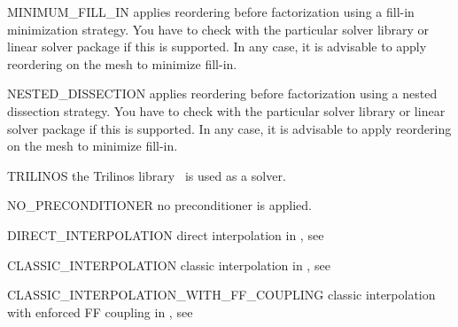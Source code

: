 \begin{memberdesc}[SolverOptions]{MINIMUM_FILL_IN}
applies reordering before factorization using a fill-in minimization strategy.
You have to check with the particular solver library or linear solver package
if this is supported. In any case, it is advisable to apply reordering on the
mesh to minimize fill-in.
\end{memberdesc}

\begin{memberdesc}[SolverOptions]{NESTED_DISSECTION}
applies reordering before factorization using a nested dissection strategy.
You have to check with the particular solver library or linear solver package
if this is supported. In any case, it is advisable to apply reordering on the
mesh to minimize fill-in.
\end{memberdesc}

\begin{memberdesc}[SolverOptions]{TRILINOS}
the Trilinos library~\cite{Trilinos} is used as a solver.
\end{memberdesc}

\begin{memberdesc}[SolverOptions]{NO_PRECONDITIONER}
no preconditioner is applied.
\end{memberdesc}

\begin{memberdesc}[SolverOptions]{DIRECT_INTERPOLATION}
direct interpolation in \AMG, see \cite{AMG}
\end{memberdesc}
\begin{memberdesc}[SolverOptions]{CLASSIC_INTERPOLATION}
classic interpolation in \AMG, see \cite{AMG}
\end{memberdesc}
\begin{memberdesc}[SolverOptions]{CLASSIC_INTERPOLATION_WITH_FF_COUPLING}
classic interpolation with enforced FF coupling in \AMG, see \cite{AMG}
\end{memberdesc}



